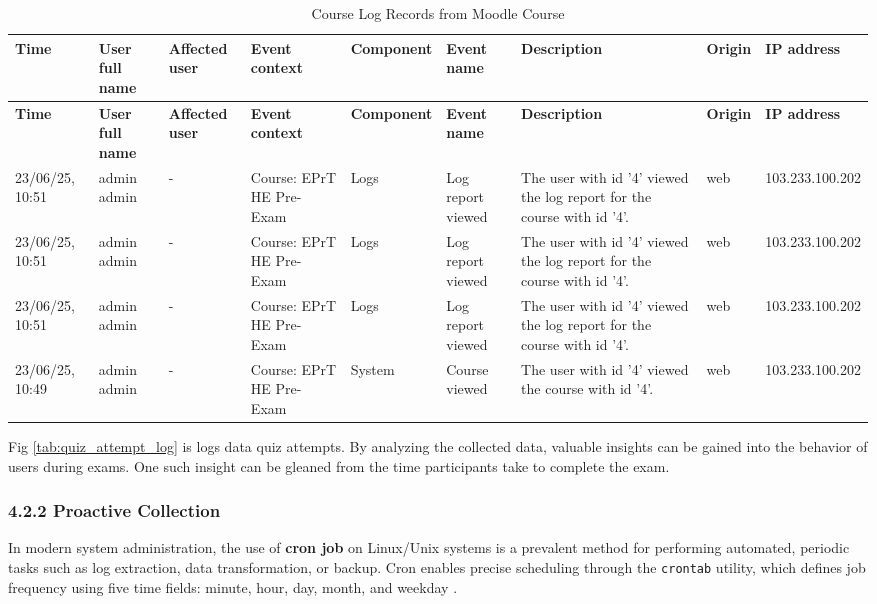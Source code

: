 \begin{landscape}
	\begin{longtable}{|p{1.4cm}|p{2cm}|p{1.3cm}|p{2.5cm}|p{1.8cm}|p{3cm}|p{4.2cm}|p{1.2cm}|p{2.5cm}|}
		\caption{Course Log Records from Moodle Course} \label{tab:course-log} \\
		\hline
		\textbf{Time} & \textbf{User full name} & \textbf{Affected user} & \textbf{Event context} & \textbf{Component} & \textbf{Event name} & \textbf{Description} & \textbf{Origin} & \textbf{IP address} \\
		\hline
		\endfirsthead
		
		\hline
		\textbf{Time} & \textbf{User full name} & \textbf{Affected user} & \textbf{Event context} & \textbf{Component} & \textbf{Event name} & \textbf{Description} & \textbf{Origin} & \textbf{IP address} \\
		\hline
		\endhead
		
		23/06/25, 10:51 & admin admin & - & Course: EPrT HE Pre-Exam & Logs & Log report viewed & The user with id '4' viewed the log report for the course with id '4'. & web & 103.233.100.202 \\
		\hline
		23/06/25, 10:51 & admin admin & - & Course: EPrT HE Pre-Exam & Logs & Log report viewed & The user with id '4' viewed the log report for the course with id '4'. & web & 103.233.100.202 \\
		\hline
		23/06/25, 10:51 & admin admin & - & Course: EPrT HE Pre-Exam & Logs & Log report viewed & The user with id '4' viewed the log report for the course with id '4'. & web & 103.233.100.202 \\
		\hline
		23/06/25, 10:49 & admin admin & - & Course: EPrT HE Pre-Exam & System & Course viewed & The user with id '4' viewed the course with id '4'. & web & 103.233.100.202 \\
		\hline
		
	\end{longtable}
\end{landscape}

Fig \ref{tab:quiz_attempt_log} is logs data quiz attempts. By analyzing the collected data, valuable insights can be gained into the behavior of users during exams. One such insight can be gleaned from the time participants take to complete the exam.
\subsubsection{4.2.2 Proactive Collection}
In modern system administration, the use of \textbf{cron job} on Linux/Unix systems is a prevalent method for performing automated, periodic tasks such as log extraction, data transformation, or backup. Cron enables precise scheduling through the \texttt{crontab} utility, which defines job frequency using five time fields: minute, hour, day, month, and weekday \citet{davidovic2015cron}.

